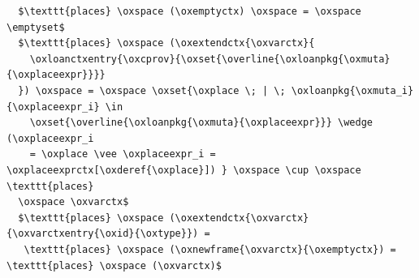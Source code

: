 \begin{lstlisting}
  $\texttt{places} \oxspace (\oxemptyctx) \oxspace = \oxspace \emptyset$
  $\texttt{places} \oxspace (\oxextendctx{\oxvarctx}{
    \oxloanctxentry{\oxcprov}{\oxset{\overline{\oxloanpkg{\oxmuta}{\oxplaceexpr}}}}
  }) \oxspace = \oxspace \oxset{\oxplace \; | \; \oxloanpkg{\oxmuta_i}{\oxplaceexpr_i} \in
    \oxset{\overline{\oxloanpkg{\oxmuta}{\oxplaceexpr}}} \wedge (\oxplaceexpr_i
    = \oxplace \vee \oxplaceexpr_i = \oxplaceexprctx[\oxderef{\oxplace}]) } \oxspace \cup \oxspace \texttt{places}
  \oxspace \oxvarctx$
  $\texttt{places} \oxspace (\oxextendctx{\oxvarctx}{\oxvarctxentry{\oxid}{\oxtype}}) =
   \texttt{places} \oxspace (\oxnewframe{\oxvarctx}{\oxemptyctx}) = \texttt{places} \oxspace (\oxvarctx)$
\end{lstlisting}
